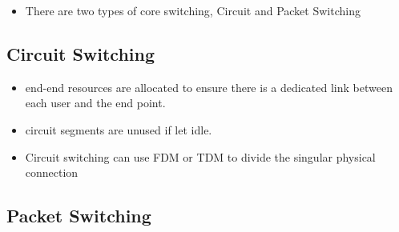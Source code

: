 \documentclass[twoside]{article}
\begin{document}
\begin{itemize}
\item There are two types of core switching, Circuit and Packet Switching
\end{itemize}

\subsection{Circuit Switching}
\begin{itemize}
\item end-end resources are allocated to ensure there is a dedicated link between each user and the end point. 
\item circuit segments are unused if let idle.
\item Circuit switching can use FDM or TDM to divide the singular physical connection
\end{itemize}

\subsection{Packet Switching}
\end{document}
